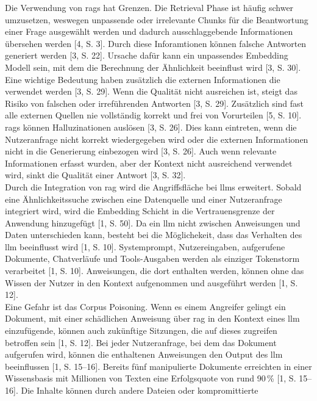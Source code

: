Die Verwendung von \acp{rag} hat Grenzen. Die Retrieval Phase ist häufig schwer umzusetzen, weswegen unpassende oder irrelevante Chunks für die Beantwortung einer
Frage ausgewählt werden und dadurch ausschlaggebende Informationen übersehen werden [4, S. 3]. Durch diese Inforamtionen können falsche Antworten generiert 
werden [3, S. 22]. Ursache dafür kann ein unpassendes Embedding Modell sein, mit dem die Berechnung der Ähnlichkeit beeinflust wird [3, S. 30]. Eine wichtige 
Bedeutung haben zusätzlich die externen Informationen die verwendet werden [3, S. 29]. Wenn die Qualität nicht ausreichen ist, steigt das Risiko von 
falschen oder irreführenden Antworten [3, S. 29]. Zusätzlich sind fast alle externen Quellen nie vollständig korrekt und frei von Vorurteilen [5, S. 10]. \\
\acp{rag} können Halluzinationen auslösen [3, S. 26]. Dies kann eintreten, wenn die Nutzeranfrage nicht korrekt wiedergegeben wird oder die externen Informationen
nicht in die Generierung einbezogen wird [3, S. 26]. Auch wenn relevante Informationen erfasst wurden, aber der Kontext nicht ausreichend verwendet wird, sinkt die
Qualität einer Antwort [3, S. 32]. \\
Durch die Integration von \ac{rag} wird die Angriffsfläche bei \acp{llm} erweitert. Sobald eine Ähnlichkeitssuche zwischen eine Datenquelle und einer Nutzeranfrage
integriert wird, wird die Embedding Schicht in die Vertrauensgrenze der Anwendung hinzugefügt [1, S. 50]. Da ein \ac{llm} nicht zwischen Anweisungen und Daten 
unterschieden kann, besteht bei die Möglichekeit, dass das Verhalten des \ac{llm} beeinflusst wird [1, S. 10]. Systemprompt, Nutzereingaben, aufgerufene Dokumente,
Chatverläufe und Tools-Ausgaben werden als einziger Tokenstorm verarbeitet [1, S. 10]. Anweisungen, die dort enthalten werden, können ohne das Wissen der Nutzer 
in den Kontext aufgenommen und ausgeführt werden [1, S. 12]. \\
Eine Gefahr ist das Corpus Poisoning. Wenn es einem Angreifer gelingt ein Dokument, mit einer schädlichen Anweisung über \ac{rag} in den Kontext eines \ac{llm} 
einzufügende, können auch zukünftige Sitzungen, die auf dieses zugreifen betroffen sein [1, S. 12]. Bei jeder Nutzeranfrage, bei dem das Dokument aufgerufen wird,
können die enthaltenen Anweisungen den Output des \ac{llm} beeinflussen [1, S. 15–16]. Bereits fünf manipulierte Dokumente 
erreichten in einer Wissensbasis mit Millionen von Texten eine Erfolgsquote von rund 90\,\% [1, S. 15--16]. Die Inhalte können durch andere Dateien oder kompromittierte
